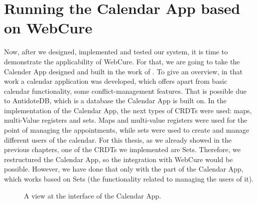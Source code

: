 \section{Running the Calendar App based on WebCure}

Now, after we designed, implemented and tested our system, it is time to demonstrate the applicability of WebCure. For that, we are going to take the Calender App designed and built in the work of \citet{54}. To give an overview, in that work a calendar application was developed, which offers apart from basic calendar functionality, some conflict-management features. That is possible due to AntidoteDB, which is a database the Calendar App is built on. In the implementation of the Calendar App, the next types of CRDTs were used: maps, multi-Value registers and sets. Maps and multi-value registers were used for the point of managing the appointments, while sets were used to create and manage different users of the calendar. For this thesis, as we already showed in the previous chapters, one of the CRDTs we implemented are Sets. Therefore, we restructured the Calendar App, so the integration with WebCure would be possible. However, we have done that only with the part of the Calendar App, which works based on Sets (the functionality related to managing the users of it).

\begin{figure}[!htb]
    \begin{center}
    \setlength{\fboxsep}{4pt}%
    \setlength{\fboxrule}{1pt}%
    {\scriptsize%
     }
    \caption {A view at the interface of the Calendar App.}
    \label{fig:ev-fig-1}
\end{center}
\end{figure}

